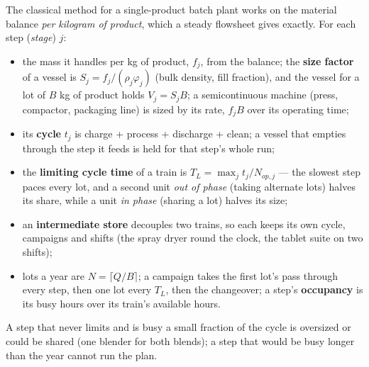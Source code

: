 \documentclass[11pt,a4paper]{article}
\providecommand{\tightlist}{\setlength{\itemsep}{0pt}\setlength{\parskip}{0pt}}
\begin{document}
The classical method for a single-product batch plant works on the
material balance \emph{per kilogram of product}, which a steady
flowsheet gives exactly. For each step (\emph{stage}) $j$:
\begin{itemize}
\tightlist
\item
  the mass it handles per kg of product, $f_j$, from the balance; the
  \textbf{size factor} of a vessel is $S_j = f_j / (\rho_j \varphi_j)$
  (bulk density, fill fraction), and the vessel for a lot of $B$ kg of
  product holds $V_j = S_j B$; a semicontinuous machine (press,
  compactor, packaging line) is sized by its rate, $f_j B$ over its
  operating time;
\item
  its \textbf{cycle} $t_j$ is charge + process + discharge + clean; a
  vessel that empties through the step it feeds is held for that step's
  whole run;
\item
  the \textbf{limiting cycle time} of a train is $T_L = \max_j t_j /
  N_{op,j}$ --- the slowest step paces every lot, and a second unit
  \emph{out of phase} (taking alternate lots) halves its share, while a
  unit \emph{in phase} (sharing a lot) halves its size;
\item
  an \textbf{intermediate store} decouples two trains, so each keeps its
  own cycle, campaigns and shifts (the spray dryer round the clock, the
  tablet suite on two shifts);
\item
  lots a year are $N = \lceil Q / B \rceil$; a campaign takes the first
  lot's pass through every step, then one lot every $T_L$, then the
  changeover; a step's \textbf{occupancy} is its busy hours over its
  train's available hours.
\end{itemize}
A step that never limits and is busy a small fraction of the cycle is
oversized or could be shared (one blender for both blends); a step that
would be busy longer than the year cannot run the plan.
\end{document}
